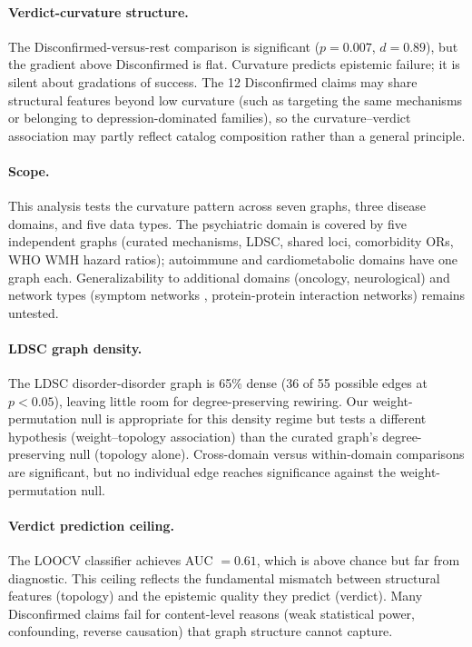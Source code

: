 \documentclass{article}
\begin{document}
\paragraph{Verdict-curvature structure.} The Disconfirmed-versus-rest comparison is significant ($p = 0.007$, $d = 0.89$), but the gradient above Disconfirmed is flat. Curvature predicts epistemic failure; it is silent about gradations of success. The 12 Disconfirmed claims may share structural features beyond low curvature (such as targeting the same mechanisms or belonging to depression-dominated families), so the curvature--verdict association may partly reflect catalog composition rather than a general principle.

\paragraph{Scope.} This analysis tests the curvature pattern across seven graphs, three disease domains, and five data types. The psychiatric domain is covered by five independent graphs (curated mechanisms, LDSC, shared loci, comorbidity ORs, WHO WMH hazard ratios); autoimmune and cardiometabolic domains have one graph each. Generalizability to additional domains (oncology, neurological) and network types (symptom networks \citep{borsboom2021network}, protein-protein interaction networks) remains untested.

\paragraph{LDSC graph density.} The LDSC disorder-disorder graph is 65\% dense (36 of 55 possible edges at $p < 0.05$), leaving little room for degree-preserving rewiring. Our weight-permutation null is appropriate for this density regime but tests a different hypothesis (weight--topology association) than the curated graph's degree-preserving null (topology alone). Cross-domain versus within-domain comparisons are significant, but no individual edge reaches significance against the weight-permutation null.

\paragraph{Verdict prediction ceiling.} The LOOCV classifier achieves AUC $= 0.61$, which is above chance but far from diagnostic. This ceiling reflects the fundamental mismatch between structural features (topology) and the epistemic quality they predict (verdict). Many Disconfirmed claims fail for content-level reasons (weak statistical power, confounding, reverse causation) that graph structure cannot capture.
\end{document}

